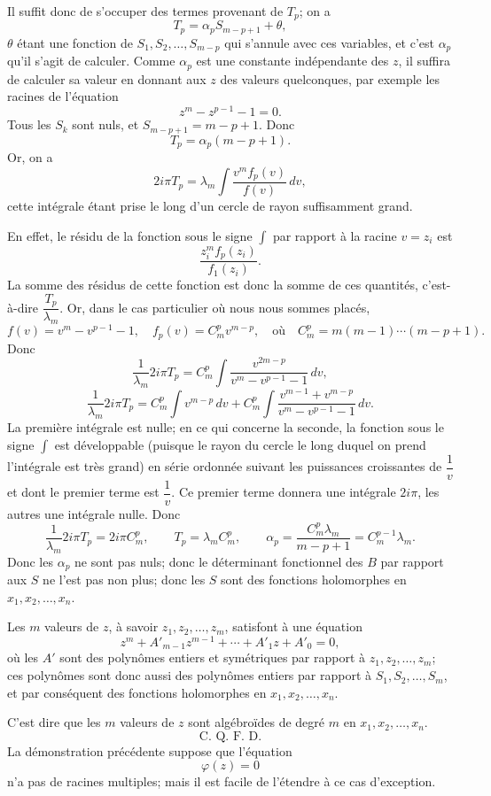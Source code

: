 \documentclass[11pt]{article}
\begin{document}
Il suffit donc de s'occuper des termes provenant de $T_p$; on a
\[
T_p=\alpha_p S_{m-p+1}+\theta,
\]
$\theta$ étant une fonction de $S_1,S_2,\ldots,S_{m-p}$ qui s'annule avec ces variables, et c'est $\alpha_p$ qu'il s'agit de calculer. Comme $\alpha_p$ est une constante indépendante des $z$, il suffira de calculer sa valeur en donnant aux $z$ des valeurs quelconques, par exemple les racines de l'équation
\[
z^m-z^{p-1}-1=0.
\]
Tous les $S_k$ sont nuls, et $S_{m-p+1}=m-p+1$. Donc
\[
T_p=\alpha_p(m-p+1).
\]
Or, on a
\[
2i\pi T_p=\lambda_m\int \frac{v^m f_p(v)}{f(v)}\,dv,
\]
cette intégrale étant prise le long d'un cercle de rayon suffisamment grand.

En effet, le résidu de la fonction sous le signe $\int$ par rapport à la racine $v=z_i$ est
\[
\frac{z_i^m f_p(z_i)}{f_1(z_i)}.
\]
La somme des résidus de cette fonction est donc la somme de ces quantités, c'est-à-dire $\dfrac{T_p}{\lambda_m}$. Or, dans le cas particulier où nous nous sommes placés,
\[
f(v)=v^m-v^{p-1}-1,
\quad
f_p(v)=C_m^p v^{m-p},
\quad \text{où}\quad C_m^p=m(m-1)\cdots(m-p+1).
\]
Donc
\[
\frac{1}{\lambda_m}2i\pi T_p=C_m^p\int \frac{v^{2m-p}}{v^m-v^{p-1}-1}\,dv,
\]
\[
\frac{1}{\lambda_m}2i\pi T_p=C_m^p\int v^{m-p}\,dv+C_m^p\int \frac{v^{m-1}+v^{m-p}}{v^m-v^{p-1}-1}\,dv.
\]
La première intégrale est nulle; en ce qui concerne la seconde, la fonction sous le signe $\int$ est développable (puisque le rayon du cercle le long duquel on prend l'intégrale est très grand) en série ordonnée suivant les puissances croissantes de $\dfrac1v$ et dont le premier terme est $\dfrac1v$. Ce premier terme donnera une intégrale $2i\pi$, les autres une intégrale nulle. Donc
\[
\frac{1}{\lambda_m}2i\pi T_p=2i\pi C_m^p,
\qquad
T_p=\lambda_m C_m^p,
\qquad
\alpha_p=\frac{C_m^p\lambda_m}{m-p+1}=C_m^{p-1}\lambda_m.
\]
Donc les $\alpha_p$ ne sont pas nuls; donc le déterminant fonctionnel des $B$ par rapport aux $S$ ne l'est pas non plus; donc les $S$ sont des fonctions holomorphes en $x_1,x_2,\ldots,x_n$.

Les $m$ valeurs de $z$, à savoir $z_1,z_2,\ldots,z_m$, satisfont à une équation
\[
z^m+A'_{m-1}z^{m-1}+\cdots+A'_1z+A'_0=0,
\]
où les $A'$ sont des polynômes entiers et symétriques par rapport à $z_1,z_2,\ldots,z_m$; ces polynômes sont donc aussi des polynômes entiers par rapport à $S_1,S_2,\ldots,S_m$, et par conséquent des fonctions holomorphes en $x_1,x_2,\ldots,x_n$.

C'est dire que les $m$ valeurs de $z$ sont algébroïdes de degré $m$ en $x_1,x_2,\ldots,x_n$.
\[
\text{C. Q. F. D.}
\]
La démonstration précédente suppose que l'équation
\[
\varphi(z)=0
\]
n'a pas de racines multiples; mais il est facile de l'étendre à ce cas d'exception.
\end{document}
